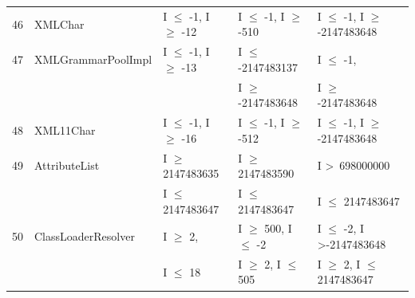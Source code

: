 {\begin{longtable}{|l|l|l|l|l|}
46	& XMLChar					& I $\le$ -1, I $\ge$ -12			& I $\le$ -1, I $\ge$ -510			& I $\le$ -1, I $\ge$ -2147483648	\\
47	& XMLGrammarPoolImpl		& I $\le$ -1, I $\ge$ -13			& I $\le$ -2147483137 			& I $\le$ -1, 							\\ 
	&							&								& I $\ge$ -2147483648			& I $\ge$ -2147483648				\\
48	& XML11Char				& I $\le$ -1, I $\ge$ -16			& I $\le$ -1, I $\ge$ -512			& I $\le$ -1, I $\ge$ -2147483648	\\ 
49	& AttributeList				& I $\ge$ 2147483635			& I $\ge$ 2147483590			& I \textgreater~698000000					\\ 
	&                                             & I $\le$ 2147483647			& I $\le$ 2147483647			& I $\le$ 2147483647 					\\
50	& ClassLoaderResolver		&  I $\ge$ 2,						& I $\ge$ 500, I $\le$ -2			& I $\le$ -2, I \textgreater -2147483648  	\\ 
	& \label{table:stripDomains7}  &  I $\le$ 18						& I $\ge$ 2, I $\le$ 505			& I $\ge$ 2, I $\le$ 2147483647	\\ \hline
	
\end{longtable}
}

